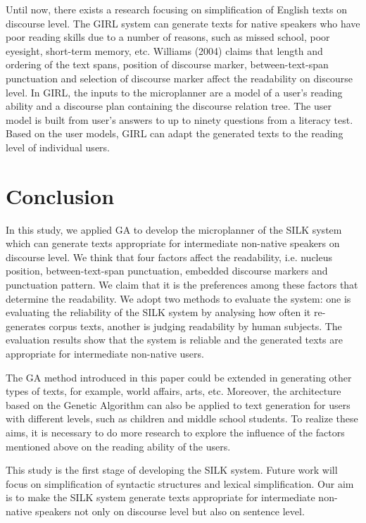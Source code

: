 \documentclass[english]{jnlp_1.2.0}
\begin{document}
Until now, there exists a research focusing on simplification
of English texts on discourse level. The GIRL system \cite{Will04}
can generate texts for native speakers who have poor reading skills
due to a number of reasons, such as missed school, poor eyesight,
short-term memory, etc. Williams (2004) claims that length and 
ordering of the text spans, position of discourse marker, 
between-text-span punctuation and selection of discourse 
marker affect the readability on discourse level. In GIRL, 
the inputs to the microplanner are a model of a user's reading 
ability and a discourse plan containing the discourse relation
tree. The user model is built from user's answers to up to 
ninety questions from a literacy test. Based on the user models,
GIRL can adapt the generated texts to the reading level of individual 
users.


\section{Conclusion}

In this study, we applied GA to develop the microplanner of the 
SILK system which can generate texts appropriate for intermediate 
non-native speakers on discourse level. We think that four
factors affect the readability, i.e. nucleus position, between-text-span 
punctuation, embedded discourse markers and punctuation pattern. 
We claim that it is the preferences among these factors that 
determine the readability. We adopt two methods to evaluate the
system: one is evaluating the reliability of the SILK system by
analysing how often it re-generates corpus texts, another is
judging readability by human subjects. The evaluation results
show that the system is reliable and the generated texts are
appropriate for intermediate non-native users.  

The GA method introduced in this paper could be extended in generating
other types of texts, for example, world affairs, arts, etc. Moreover, 
the architecture based on the Genetic Algorithm can also be applied to
text generation for users with different levels, such as children and
middle school students. To realize these aims, it is necessary to do
more research to explore the influence of the factors mentioned above 
on the reading ability of the users. 

This study is the first stage of developing the SILK system. Future work 
will focus on simplification of syntactic structures and lexical 
simplification. Our aim is to make the SILK system generate texts 
appropriate for intermediate non-native speakers not only on discourse
level but also on sentence level.
\end{document}
